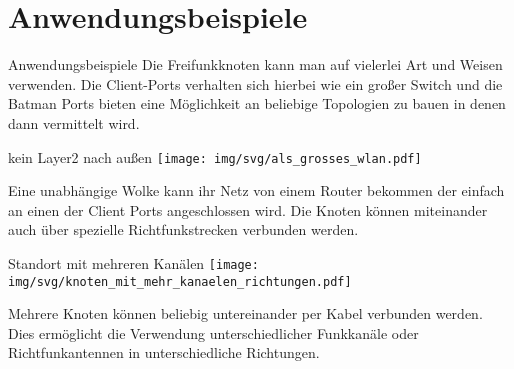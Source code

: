 \section{Anwendungsbeispiele}


\begin{frame}{Anwendungsbeispiele}
	Die Freifunkknoten kann man auf vielerlei Art und Weisen verwenden.
	Die Client-Ports verhalten sich hierbei wie ein großer Switch und die Batman Ports bieten eine Möglichkeit an
	beliebige Topologien zu bauen in denen dann vermittelt wird.
\end{frame}

\begin{frame}{kein Layer2 nach außen}
\texttt{[image: img/svg/als\_grosses\_wlan.pdf]}

Eine unabhängige Wolke kann ihr Netz von einem Router bekommen der einfach an einen der Client Ports angeschlossen wird.
Die Knoten können miteinander auch über spezielle Richtfunkstrecken verbunden werden.

\end{frame}


\begin{frame}{Standort mit mehreren Kanälen}
\texttt{[image: img/svg/knoten\_mit\_mehr\_kanaelen\_richtungen.pdf]}

Mehrere Knoten können beliebig untereinander per Kabel verbunden werden. Dies ermöglicht die Verwendung unterschiedlicher Funkkanäle oder Richtfunkantennen in unterschiedliche Richtungen.
\end{frame}

